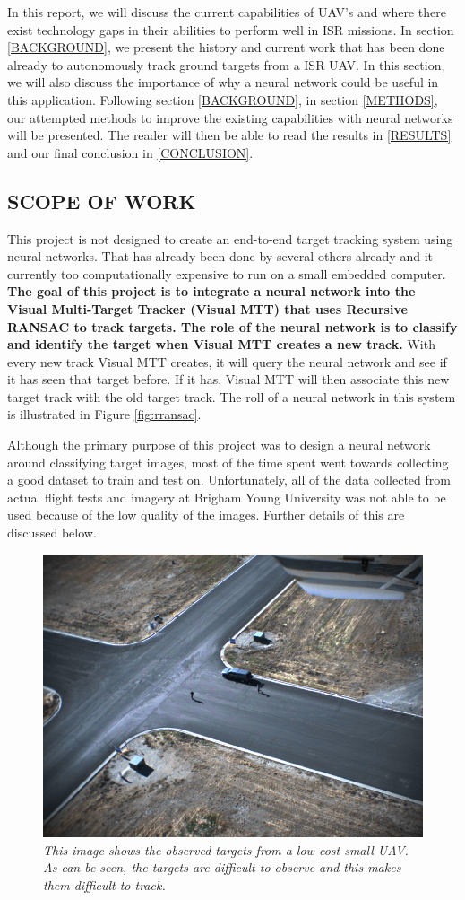 \documentclass[letterpaper, 10 pt, conference]{ieeeconf}  %
\begin{document}
In this report, we will discuss the current capabilities of UAV's and where there exist technology gaps in their abilities to perform well in ISR missions. In section \ref{BACKGROUND}, we present the history and current work that has been done already to autonomously track ground targets from a ISR UAV. In this section, we will also discuss the importance of why a neural network could be useful in this application. Following section \ref{BACKGROUND}, in section \ref{METHODS}, our attempted methods to improve the existing capabilities with neural networks will be presented. The reader will then be able to read the results in \ref{RESULTS} and our final conclusion in \ref{CONCLUSION}.

\subsection{SCOPE OF WORK}

This project is not designed to create an end-to-end target tracking system using neural networks. That has already been done by several others already and it currently too computationally expensive to run on a small embedded computer. \textbf{The goal of this project is to integrate a neural network into the Visual Multi-Target Tracker (Visual MTT) that uses Recursive RANSAC to track targets. The role of the neural network is to classify and identify the target when Visual MTT creates a new track.} With every new track Visual MTT creates, it will query the neural network and see if it has seen that target before. If it has, Visual MTT will then associate this new target track with the old target track. The roll of a neural network in this system is illustrated in Figure \ref{fig:rransac}.

Although the primary purpose of this project was to design a neural network around classifying target images, most of the time spent went towards collecting a good dataset to train and test on. Unfortunately, all of the data collected from actual flight tests and imagery at Brigham Young University was not able to be used because of the low quality of the images. Further details of this are discussed below.

\begin{figure}
	\begin{center}
		\includegraphics[width=.45\textwidth]{gimbal_far.png}
		\caption{\textit{This image shows the observed targets from a low-cost small UAV. As can be seen, the targets are difficult to observe and this makes them difficult to track.}} 
		\label{fig:gimbal_far}
	\end{center}
\end{figure}
\end{document}
